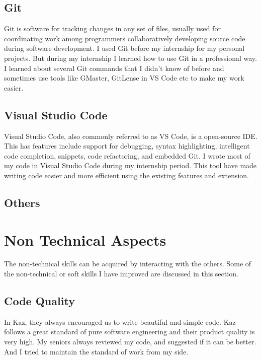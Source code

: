 \subsection{Git}

Git is software for tracking changes in any set of files, usually used for coordinating work among programmers collaboratively developing source code during software development.
I used Git before my internship for my personal projects.
But during my internship I learned how to use Git in a professional way.
I learned about several Git commands that I didn't know of before and sometimes use tools like GMaster, GitLense in VS Code etc to make my work easier.

\subsection{Visual Studio Code}

Visual Studio Code, also commonly referred to as VS Code, is a open-source IDE.
This has features include support for debugging, syntax highlighting, intelligent code completion, snippets, code refactoring, and embedded Git.
I wrote most of my code in Visual Studio Code during my internship period.
This tool have made writing code easier and more efficient using the existing features and extension.

\subsection{Others}




\section{Non Technical Aspects}

The non-technical skills can be acquired by interacting with the others.
Some of the non-technical or soft skills I have improved are discussed in this section.

\subsection{Code Quality}

In Kaz, they always encouraged us to write beautiful and simple code.
Kaz follows a great standard of pure software engineering and their product quality is very high.
My seniors always reviewed my code, and suggested if it can be better.
And I tried to maintain the standard of work from my side.

